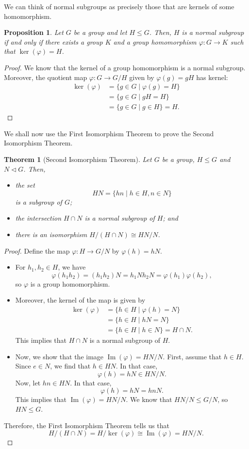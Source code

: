\documentclass[a4paper, openany]{memoir}
\theoremstyle{definition}
\theoremstyle{plain}
\newtheorem{theorem}[definition]{Theorem}
\newtheorem{proposition}[definition]{Proposition}
\begin{document}
We can think of normal subgroups as precisely those that are kernels of some homomorphism.
\begin{proposition}
Let $G$ be a group and let $H \leqslant G$. Then, $H$ is a normal subgroup if and only if there exists a group $K$ and a group homomorphism $\varphi: G \to K$ such that $\ker (\varphi) = H$.
\end{proposition}
\begin{proof}
We know that the kernel of a group homomorphism is a normal subgroup. Moreover, the quotient map $\varphi: G \to G/H$ given by $\varphi(g) = gH$ has kernel:
\begin{align*}
    \ker (\varphi) &= \{g \in G \mid \varphi(g) = H\} \\
    &= \{g \in G \mid gH = H\} \\
    &= \{g \in G \mid g \in H\} = H.
\end{align*}
\end{proof}
We shall now use the First Isomorphism Theorem to prove the Second Isomorphism Theorem.
\begin{theorem}[Second Isomorphism Theorem]
Let $G$ be a group, $H \leqslant G$ and $N \vartriangleleft G$. Then,
\begin{itemize}
    \item the set 
    \[HN = \{hn \mid h \in H, n \in N\}\]
    is a subgroup of $G$;
    \item the intersection $H \cap N$ is a normal subgroup of $H$; and
    \item there is an isomorphism $H/(H \cap N) \cong HN/N$.
\end{itemize}
\end{theorem}
\begin{proof}
Define the map $\varphi: H \to G/N$ by $\varphi(h) = hN$. 
\begin{itemize}
    \item For $h_1, h_2 \in H$, we have
    \[\varphi(h_1h_2) = (h_1h_2)N = h_1N h_2N = \varphi(h_1) \varphi(h_2),\]
    so $\varphi$ is a group homomorphism.
    
    \item Moreover, the kernel of the map is given by
    \begin{align*}
        \ker (\varphi) &= \{h \in H \mid \varphi(h) = N\} \\
        &= \{h \in H \mid hN = N\} \\
        &= \{h \in H \mid h \in N\} = H \cap N.
    \end{align*}
    This implies that $H \cap N$ is a normal subgroup of $H$. 
    
    \item Now, we show that the image $\operatorname{Im}(\varphi) = HN/N$. First, assume that $h \in H$. Since $e \in N$, we find that $h \in HN$. In that case, 
    \[\varphi(h) = hN \in HN/N.\]
    Now, let $hn \in HN$. In that case,
    \[\varphi(h) = hN = hnN.\]
    This implies that $\operatorname{Im}(\varphi) = HN/N$. We know that $HN/N \leqslant G/N$, so $HN \leqslant G$.
\end{itemize}
Therefore, the First Isomorphism Theorem tells us that
\[H/(H \cap N) = H/\ker (\varphi) \cong \operatorname{Im}(\varphi) = HN/N.\]
\end{proof}
\end{document}
